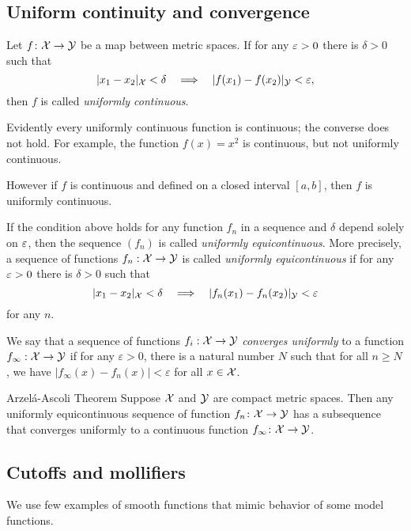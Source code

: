 \subsection*{Uniform continuity and convergence}

Let $f\colon{\mathcal{X}}\to \mathcal{Y}$ be a map between metric spaces.
If  for any $\varepsilon>0$ there is $\delta>0$ such that 
\[|x_1-x_2|_{\mathcal{X}}<\delta\quad\Longrightarrow\quad |f(x_1)-f(x_2)|_\mathcal{Y}<\varepsilon,\]
then $f$ is called \emph{uniformly continuous}.

Evidently every uniformly continuous function is continuous;
the converse does not hold.
For example, the function $f(x)=x^2$ is continuous, but not uniformly continuous.

However if $f$ is continuous and defined on a closed interval $[a,b]$, then $f$ is uniformly continuous.

If the condition above holds for any function $f_n$ in a sequence and $\delta$ depend solely on $\varepsilon$,
then the sequence $(f_n)$ is called \emph{uniformly equicontinuous}.
More precisely, 
a sequence of functions $f_n:{\mathcal{X}}\to \mathcal{Y}$ is called {}\emph{uniformly equicontinuous} if 
for any $\varepsilon>0$ there is $\delta>0$ such that 
\[|x_1-x_2|_{\mathcal{X}}<\delta\quad\Longrightarrow\quad |f_n(x_1)-f_n(x_2)|_\mathcal{Y}<\varepsilon\]
for any $n$.


We say that a sequence of functions $f_i : {\mathcal{X}} \to \mathcal{Y}$ \emph{converges uniformly} to a function $f_{\infty}: {\mathcal{X}} \to \mathcal{Y}$ if for any 
$\varepsilon >0$, there is a natural number $N$ such that for all $n \geq N$, we have $| f_{\infty} (x)- f_n (x) | < \varepsilon$
for all $x  \in {\mathcal{X}}$.

\begin{thm}{Arzel\'{a}-Ascoli Theorem}\label{lem:equicontinuous}
Suppose $\mathcal{X}$ and $\mathcal{Y}$ are compact metric spaces. 
Then any uniformly equicontinuous sequence of function $f_n\colon\mathcal{X}\to \mathcal{Y}$ has a subsequence that converges uniformly to a continuous function $f_\infty\colon\mathcal{X}\to \mathcal{Y}$. 
\end{thm}

\subsection*{Cutoffs and mollifiers}

We use few examples of smooth functions that mimic behavior of some model functions.

